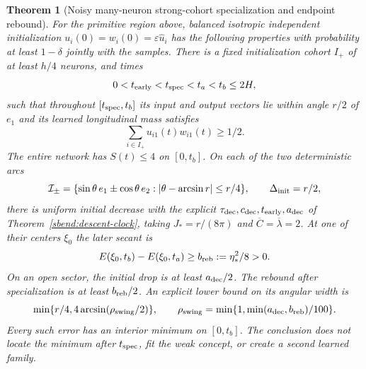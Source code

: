 \documentclass{article} %
\theoremstyle{plain}
\newtheorem{theorem}{Theorem}[section]
\theoremstyle{definition}
\theoremstyle{remark}
\begin{document}
\begin{theorem}[Noisy many-neuron strong-cohort specialization and endpoint rebound]
\label{sbsep:theorem}
For the primitive region above, balanced isotropic independent
initialization $u_i(0)=w_i(0)=\varepsilon\widehat u_i$ has the following
properties with probability at least $1-\delta$ jointly with the samples.
There is a fixed initialization cohort $I_+$ of at least $h/4$ neurons,
and times
\[
 0<t_{\rm early}<t_{\rm spec}<t_a<t_b\le2H,
\]
such that throughout $[t_{\rm spec},t_b]$ its input and output vectors
lie within angle $r/2$ of $e_1$ and its learned longitudinal mass satisfies
\begin{equation}\label{sbsep:learned-mass}
 \sum_{i\in I_+}u_{i1}(t)w_{i1}(t)\ge1/2.
\end{equation}
The entire network has $S(t)\le4$ on $[0,t_b]$.
On each of the two deterministic arcs
\[
 \mathcal I_\pm=\{\sin\theta\,e_1\pm\cos\theta\,e_2:
       |\theta-\arcsin r|\le r/4\},\qquad
 \Delta_{\rm init}=r/2,
\]
there is uniform initial decrease with the explicit
$\tau_{\rm dec},c_{\rm dec},t_{\rm early},a_{\rm dec}$ of
Theorem~\ref{sbend:descent-clock}, taking
$J_*=r/(8\pi)$ and $\overline C=\overline\lambda=2$.
At one of their centers $\xi_0$ the later secant is
\begin{equation}\label{sbsep:noisy-rebound}
 E(\xi_0,t_b)-E(\xi_0,t_a)\ge b_{\rm reb}:=\eta_*^2/8>0.
\end{equation}
On an open sector, the initial drop is at least $a_{\rm dec}/2$.
The rebound after specialization is at least $b_{\rm reb}/2$.
An explicit lower bound on its angular width is
\begin{equation}\label{sbsep:final-sector}
 \min\{r/4,4\arcsin(\rho_{\rm swing}/2)\},\qquad
 \rho_{\rm swing}=\min\{1,\min(a_{\rm dec},b_{\rm reb})/100\}.
\end{equation}
Every such error has an interior minimum on $[0,t_b]$.
The conclusion does not locate the minimum after $t_{\rm spec}$, fit the
weak concept, or create a second learned family.
\end{theorem}
\end{document}
